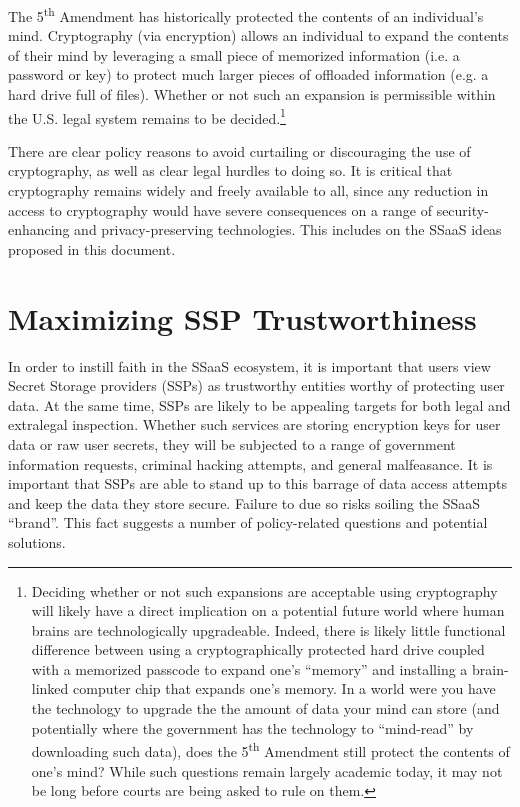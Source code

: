 The 5\textsuperscript{th} Amendment has historically protected the
contents of an individual's mind. Cryptography (via encryption) allows
an individual to expand the contents of their mind by leveraging a
small piece of memorized information (i.e. a password or key) to
protect much larger pieces of offloaded information (e.g. a hard drive
full of files). Whether or not such an expansion is permissible within
the U.S. legal system remains to be decided.\footnote{Deciding whether
  or not such expansions are acceptable using cryptography will likely
  have a direct implication on a potential future world where human
  brains are technologically upgradeable. Indeed, there is likely
  little functional difference between using a cryptographically
  protected hard drive coupled with a memorized passcode to expand
  one's ``memory'' and installing a brain-linked computer chip that
  expands one's memory. In a world were you have the technology to
  upgrade the the amount of data your mind can store (and potentially
  where the government has the technology to ``mind-read'' by
  downloading such data), does the 5\textsuperscript{th} Amendment
  still protect the contents of one's mind? While such questions
  remain largely academic today, it may not be long before courts are
  being asked to rule on them.}

There are clear policy reasons to avoid curtailing or discouraging the
use of cryptography, as well as clear legal hurdles to doing so. It is
critical that cryptography remains widely and freely available to all,
since any reduction in access to cryptography would have severe
consequences on a range of security-enhancing and privacy-preserving
technologies. This includes on the SSaaS ideas proposed in this
document.

\section{Maximizing SSP Trustworthiness}

In order to instill faith in the SSaaS ecosystem, it is important that
users view Secret Storage providers (SSPs) as trustworthy entities
worthy of protecting user data. At the same time, SSPs are likely to
be appealing targets for both legal and extralegal inspection.
Whether such services are storing encryption keys for user data or raw
user secrets, they will be subjected to a range of government
information requests, criminal hacking attempts, and general
malfeasance. It is important that SSPs are able to stand up to this
barrage of data access attempts and keep the data they store
secure. Failure to due so risks soiling the SSaaS ``brand''. This fact
suggests a number of policy-related questions and potential solutions.

